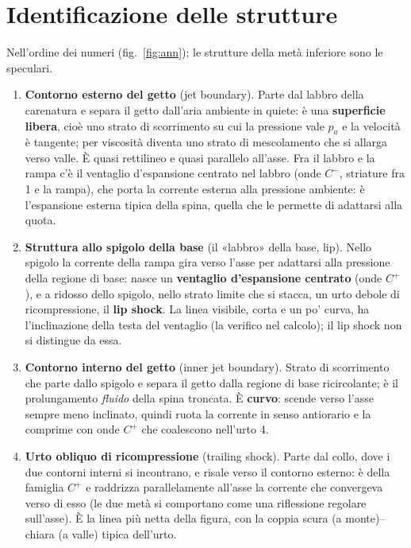 \documentclass[11pt,a4paper]{article}
\newcommand{\Cp}{C^{+}}
\newcommand{\Cm}{C^{-}}
\begin{document}
\section{Identificazione delle strutture}
Nell'ordine dei numeri (fig.~\ref{fig:ann}); le strutture della metà inferiore sono le speculari.
\begin{enumerate}
\item \textbf{Contorno esterno del getto} (jet boundary). Parte dal labbro della carenatura e separa il getto
  dall'aria ambiente in quiete: è una \textbf{superficie libera}, cioè uno strato di scorrimento su cui la pressione
  vale $p_a$ e la velocità è tangente; per viscosità diventa uno strato di mescolamento che si allarga verso valle.
  È quasi rettilineo e quasi parallelo all'asse. Fra il labbro e la rampa c'è il ventaglio d'espansione centrato nel
  labbro (onde $\Cm$, striature fra 1 e la rampa), che porta la corrente esterna alla pressione ambiente: è
  l'espansione esterna tipica della spina, quella che le permette di adattarsi alla quota.
\item \textbf{Struttura allo spigolo della base} (il «labbro» della base, lip). Nello spigolo la corrente della rampa
  gira verso l'asse per adattarsi alla pressione della regione di base: nasce un \textbf{ventaglio d'espansione
  centrato} (onde $\Cp$), e a ridosso dello spigolo, nello strato limite che si stacca, un urto debole di
  ricompressione, il \textbf{lip shock}. La linea visibile, corta e un po' curva, ha l'inclinazione della testa del
  ventaglio (la verifico nel calcolo); il lip shock non si distingue da essa.
\item \textbf{Contorno interno del getto} (inner jet boundary). Strato di scorrimento che parte dallo spigolo e
  separa il getto dalla regione di base ricircolante; è il prolungamento \emph{fluido} della spina troncata. È
  \textbf{curvo}: scende verso l'asse sempre meno inclinato, quindi ruota la corrente in senso antiorario e la
  comprime con onde $\Cp$ che coalescono nell'urto 4.
\item \textbf{Urto obliquo di ricompressione} (trailing shock). Parte dal collo, dove i due contorni interni si
  incontrano, e risale verso il contorno esterno: è della famiglia $\Cp$ e raddrizza parallelamente all'asse la
  corrente che convergeva verso di esso (le due metà si comportano come una riflessione regolare sull'asse). È la
  linea più netta della figura, con la coppia scura (a monte)--chiara (a valle) tipica dell'urto.

\end{enumerate}
\end{document}
